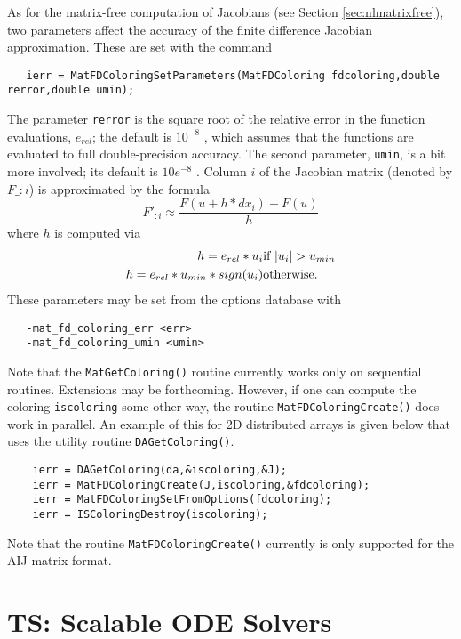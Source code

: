 {As for the matrix-free computation of Jacobians (see Section
\ref{sec:nlmatrixfree}), two parameters affect the accuracy of the
finite difference Jacobian approximation.  These are set with the command
\begin{verbatim}
   ierr = MatFDColoringSetParameters(MatFDColoring fdcoloring,double rerror,double umin);
\end{verbatim}
The parameter {\tt rerror} is the square root of 
the relative error in the function evaluations, $e_{rel}$; the default is $ 10^{-8} $ , which assumes
that the functions are evaluated to full double-precision accuracy. The 
second parameter, {\tt umin}, is a bit more involved; its default is 
$ 10e^{-8} $ .  Column $i$ of the Jacobian matrix (denoted by $F\_{:i}$) is 
approximated by the formula
\[
    F'_{:i} \approx \frac{F(u + h*dx_{i}) - F(u)}{h}
\]
where $ h $ is computed via 
\begin{eqnarray*}
        h = e_{rel}*u_{i}             &    \hbox{if }  |u_{i}| > u_{min} \\
        h = e_{rel}*u_{min}*sign(u_{i})  &    \hbox{otherwise}.
\end{eqnarray*}
These parameters may be set from the options database with 
\begin{verbatim}
   -mat_fd_coloring_err <err>
   -mat_fd_coloring_umin <umin>
\end{verbatim}
 

Note that the {\tt MatGetColoring()} routine currently 
works only on sequential routines.  Extensions may be forthcoming. However,
if one can compute the coloring {\tt iscoloring} some other way, the routine
{\tt MatFDColoringCreate()} does work in parallel. An example of this for 
2D distributed arrays is given below that uses the utility routine
{\tt DAGetColoring()}. 

\begin{verbatim}
    ierr = DAGetColoring(da,&iscoloring,&J);
    ierr = MatFDColoringCreate(J,iscoloring,&fdcoloring); 
    ierr = MatFDColoringSetFromOptions(fdcoloring);
    ierr = ISColoringDestroy(iscoloring);
\end{verbatim}

Note that the routine {\tt MatFDColoringCreate()} currently is only 
supported for the AIJ matrix format.

\chapter{TS: Scalable ODE Solvers}

}
